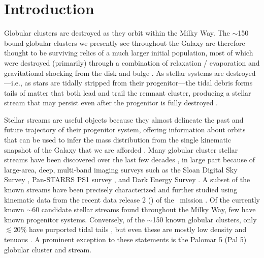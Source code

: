 \documentclass[twocolumn]{aastex63}
\newcommand{\sa}[1]{{\color{teal} SP: #1}}
\begin{document}

\section{Introduction} \label{sec:intro}

Globular clusters are destroyed as they orbit within the Milky Way.
The $\sim$150 bound globular clusters we presently see throughout the Galaxy \citep{Harris:2010} are therefore thought to be surviving relics of a much larger initial population, most of which were destroyed (primarily) through a combination of relaxation / evaporation and gravitational shocking from the disk and bulge \citep[e.g.,][]{Gnedin:1997, Gnedin:2014}.
As stellar systems are destroyed---i.e., as stars are tidally stripped from their progenitor---the tidal debris forms tails of matter that both lead and trail the remnant cluster, producing a stellar stream that may persist even after the progenitor is fully destroyed \citep[e.g.,][]{Johnston:1996}.

Stellar streams are useful objects because they almost \citep[see][]{Sanders:2013} delineate the past and future trajectory of their progenitor system, offering information about orbits that can be used to infer the mass distribution from the single kinematic snapshot of the Galaxy that we are afforded \citep[e.g.,][]{Johnston:1999, Sanders:2013, PriceWhelan:2014, Bonaca:2018}. %
Many globular cluster stellar streams have been discovered over the last few decades \citep[see, e.g.,][]{Grillmair:2016, Shipp:2018}, in large part because of large-area, deep, multi-band imaging surveys such as the Sloan Digital Sky Survey \citep[SDSS;][]{York:2000}, Pan-STARRS PS1 survey \citep{Chambers:2016}, and Dark Energy Survey \citep{DES:2016}.
A subset of the known streams have been precisely characterized and further studied \citep[e.g.,][]{PriceWhelan:2018, Malhan:2018, Shipp:2019} using kinematic data from the recent data release 2 () of the \Gaia\ mission \citep{Gaia:2016, Gaia:2018}.
Of the currently known $\sim$60 candidate stellar streams found throughout the Milky Way, few have known progenitor systems.
Conversely, of the $\sim$150 known globular clusters, only $\lesssim 20\%$ have purported tidal tails \citep[e.g.,][]{Leon:2000, Kundu:2019}, but even these are mostly low density and tenuous \citep[as might be expected, e.g.,][]{Balbinot:2018}.
A prominent exception to these statements is the Palomar 5 (Pal 5) globular cluster and stream.
\end{document}
